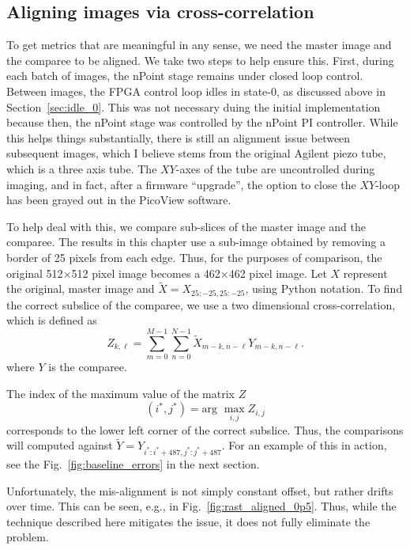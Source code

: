 \subsection{Aligning images via cross-correlation}\label{sec:align}
To get metrics that are meaningful in any sense, we need the master image and the comparee to be aligned.
We take two steps to help ensure this.
First, during each batch of images, the nPoint stage remains under closed loop control.
Between images, the FPGA control loop idles in state-0, as discussed above in Section~\ref{sec:idle_0}.
This was not necessary duing the initial implementation because then, the nPoint stage was controlled by the nPoint PI controller.
While this helps things substantially, there is still an alignment issue between subsequent images, which I believe stems from the original Agilent piezo tube, which is a three axis tube.
The $XY$-axes of the tube are uncontrolled during imaging, and in fact, after a firmware ``upgrade'', the option to close the $XY$-loop has been grayed out in the PicoView software.

To help deal with this, we compare sub-slices of the master image and the comparee. The results in this chapter use a sub-image obtained by removing a border of 25 pixels from each edge. Thus, for the purposes of comparison, the original 512$\times$512 pixel image becomes a 462$\times$462 pixel image. Let $X$ represent the original, master image and
${\tilde X=X_{25:-25, 25:-25}}$, using Python notation. To find the correct subslice of the comparee, we use a two dimensional cross-correlation, which is defined as
\begin{equation}
  Z_{k,\ell} = \sum_{m=0}^{M-1}\sum_{n=0}^{N-1} \tilde{X}_{m-k, n-\ell}Y_{m-k, n-\ell}.
\end{equation}
where $Y$ is the comparee.

The index of the maximum value of the matrix $Z$
\begin{equation}
(i^*,j^*) = \textrm{arg~} \max_{i,j}Z_{i,j}
\end{equation}
corresponds to the lower left corner of the correct subslice. Thus, the comparisons will computed against
$\tilde{Y} = Y_{i^*:i^*+487, j^*:j^*+487}$. For an example of this in action, see the Fig.~\ref{fig:baseline_errors} in the next section.

Unfortunately, the mis-alignment is not simply constant offset, but rather drifts over time. This can be seen, e.g., in Fig.~\ref{fig:rast_aligned_0p5}. Thus, while the technique described here mitigates the issue, it does not fully eliminate the problem.



